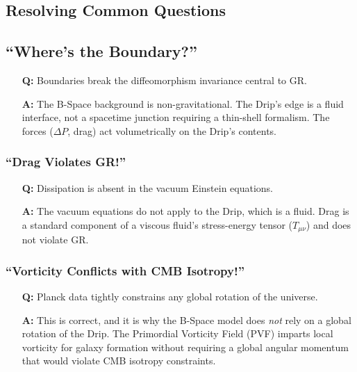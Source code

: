\documentclass{BSpacePaper} %
\begin{document}
\begin{appendices}
\subsection{Resolving Common Questions}

\subsection{“Where’s the Boundary?”}
\begin{itemize}
    \item[\textbf{Q:}] Boundaries break the diffeomorphism invariance central to GR.
    \item[\textbf{A:}] The B-Space background is non-gravitational. The Drip’s edge is a fluid interface, not a spacetime junction requiring a thin-shell formalism. The forces (\(\Delta P\), drag) act volumetrically on the Drip's contents.
\end{itemize}

\subsubsection{“Drag Violates GR!”}
\begin{itemize}
    \item[\textbf{Q:}] Dissipation is absent in the vacuum Einstein equations.
    \item[\textbf{A:}] The vacuum equations do not apply to the Drip, which is a fluid. Drag is a standard component of a viscous fluid's stress-energy tensor ($T_{\mu\nu}$) and does not violate GR.
\end{itemize}

\subsubsection{“Vorticity Conflicts with CMB Isotropy!”}
\begin{itemize}
    \item[\textbf{Q:}] Planck data tightly constrains any global rotation of the universe.
    \item[\textbf{A:}] This is correct, and it is why the B-Space model does \textit{not} rely on a global rotation of the Drip. The Primordial Vorticity Field (PVF) imparts local vorticity for galaxy formation without requiring a global angular momentum that would violate CMB isotropy constraints.
\end{itemize}


\end{appendices}
\end{document}
